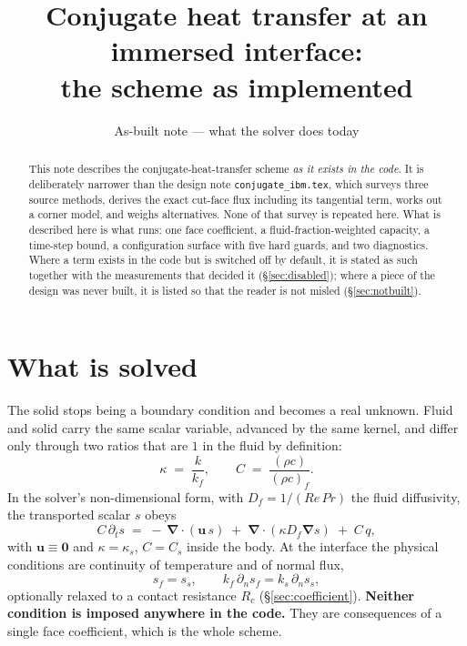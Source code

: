 \documentclass[11pt,a4paper]{article}
\title{Conjugate heat transfer at an immersed interface:\\
       \large the scheme as implemented}
\author{As-built note --- what the solver does today}
\date{}
\newcommand{\grad}{\boldsymbol{\nabla}}
\newcommand{\code}[1]{\texttt{#1}}
\begin{document}
\maketitle

\begin{abstract}
\noindent
This note describes the conjugate-heat-transfer scheme \emph{as it exists in
the code}. It is deliberately narrower than the design note
\code{conjugate\_ibm.tex}, which surveys three source methods, derives the
exact cut-face flux including its tangential term, works out a corner model,
and weighs alternatives. None of that survey is repeated here. What is
described here is what runs: one face coefficient, a fluid-fraction-weighted
capacity, a time-step bound, a configuration surface with five hard guards, and
two diagnostics. Where a term exists in the code but is switched off by
default, it is stated as such together with the measurements that decided it
(\S\ref{sec:disabled}); where a piece of the design was never built, it is
listed so that the reader is not misled (\S\ref{sec:notbuilt}).
\end{abstract}

\section{What is solved}

The solid stops being a boundary condition and becomes a real unknown. Fluid
and solid carry the same scalar variable, advanced by the same kernel, and
differ only through two ratios that are $1$ in the fluid by definition:
\[
  \kappa \;=\; \frac{k}{k_f},
  \qquad
  C \;=\; \frac{(\rho c)}{(\rho c)_f}.
\]
In the solver's non-dimensional form, with $D_f = 1/(Re\,Pr)$ the fluid
diffusivity, the transported scalar $s$ obeys
\begin{equation}
  C\,\partial_t s
  \;=\;
  -\,\grad\!\cdot\!\left(\boldsymbol{u}\,s\right)
  \;+\;
  \grad\!\cdot\!\left(\kappa D_f \grad s\right)
  \;+\; C\,q ,
  \label{eq:pde}
\end{equation}
with $\boldsymbol{u}\equiv\boldsymbol{0}$ and $\kappa=\kappa_s$, $C=C_s$ inside
the body. At the interface the physical conditions are continuity of
temperature and of normal flux,
\begin{equation}
  s_f = s_s,
  \qquad
  k_f\,\partial_n s_f = k_s\,\partial_n s_s ,
  \label{eq:interface}
\end{equation}
optionally relaxed to a contact resistance $R_c$ (\S\ref{sec:coefficient}).
\textbf{Neither condition is imposed anywhere in the code.} They are
consequences of a single face coefficient, which is the whole scheme.
\end{document}
